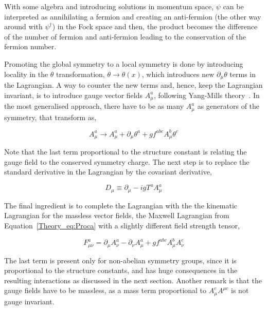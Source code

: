 With some algebra and introducing solutions in momentum space, $\psi$ can be interpreted as annihilating a fermion and creating
an anti-fermion (the other way around with $\psi^\dag$) in the Fock space and then, the product becomes the difference of the number of fermion and anti-fermion leading to the conservation of the fermion number.

Promoting the global symmetry to a local symmetry is done by introducing locality in the $\theta$ transformation,
$\theta \rightarrow\theta(x)$, which introduces new $\partial_\mu\theta$ terms in the Lagrangian.
A way to counter the new terms and, hence, keep the Lagrangian invariant, is to introduce gauge vector fields $A_\mu^a$,
following Yang-Mills theory~\cite{YangMills}. In the most generalised approach, there have to be as many $A_\mu^a$
as generators of the symmetry, that transform as,

\begin{equation}
    A_\mu^a \rightarrow A_\mu^a + \partial_\mu\theta^a + gf^{abc}A_\mu^b\theta^c
\end{equation}

Note that the last term proportional to the structure constant is relating the gauge field to the conserved symmetry charge.
The next step is to replace the standard derivative in the Lagrangian by the covariant derivative,

\begin{equation}
    D_\mu\equiv\partial_\mu - igT^aA_\mu^a
\end{equation}

The final ingredient is to complete the Lagrangian with the the kinematic Lagrangian for the massless vector fields,
the Maxwell Lagrangian from Equation~\ref{Theory_eq:Proca} with a slightly different field strength tensor,

\begin{equation}
    F_{\mu\nu}^a=\partial_\mu A_\nu^a - \partial_\nu A_\mu^a + gf^{abc}A_\mu^bA_\nu^c
\end{equation}

The last term is present only for non-abelian symmetry groups, since it is proportional to the structure constants, and has huge consequences in the resulting interactions as discussed in the next section.
Another remark is that the gauge fields have to be massless, as a mass term proportional to $A_\mu^cA^{\mu c}$ is not gauge invariant.


